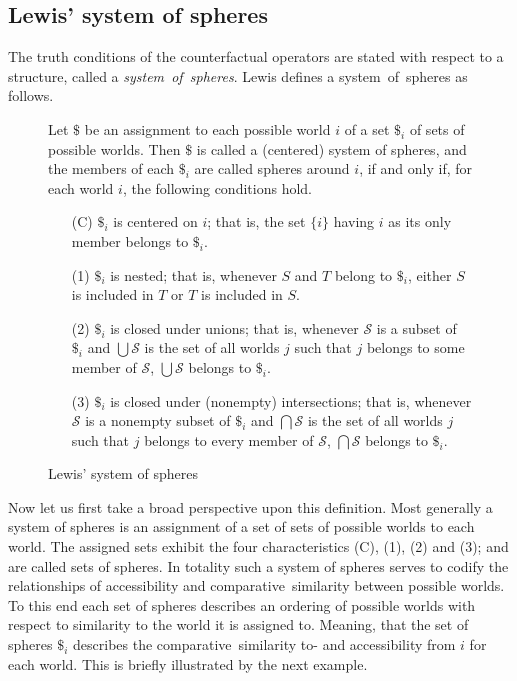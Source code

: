 \documentclass[a4paper,american]{paper}
\theoremstyle{definition}\newtheorem{definition}{Definition}
\begin{document}
\subsection{Lewis' system of spheres}
The truth conditions of the counterfactual operators are stated with respect to a structure, called a \textit{system~of~spheres}. Lewis defines a system~of~spheres as follows.
\begin{figure}[H]
	Let $\$$ be an assignment to each possible world $i$ of a set $\$_i$ of sets of possible worlds. Then $\$$ is called a (centered) system of spheres, and the members of each $\$_i$ are called spheres around $i$, if and only if, for each world $i$, the following conditions hold.
	\begin{itemize}
	\item[(C)] $\$_i$ is centered on $i$; that is, the set $\{i\}$ having $i$ as its only member belongs to $\$_i$.
	\item[(1)] $\$_i$ is nested; that is, whenever $S$ and $T$ belong to $\$_i$, either $S$ is included in $T$ or $T$ is included in $S$.
	\item[(2)] $\$_i$ is closed under unions; that is, whenever $\mathscr{S}$ is a subset of $\$_i$ and $\bigcup\mathscr{S}$ is the set of all worlds $j$ such that $j$ belongs to some member of $\mathscr{S}$, $\bigcup\mathscr{S}$ belongs to $\$_i$.
	\item[(3)] $\$_i$ is closed under (nonempty) intersections; that is, whenever $\mathscr{S}$ is a nonempty subset of $\$_i$ and $\bigcap\mathscr{S}$ is the set of all worlds $j$ such that $j$ belongs to every member of $\mathscr{S}$, $\bigcap\mathscr{S}$ belongs to $\$_i$.
	\end{itemize}
	\caption{Lewis' system of spheres}
	\label{fig:system_of_spheres}
\end{figure}
\noindent Now let us first take a broad perspective upon this definition. Most generally a system of spheres is an assignment of a set of sets of possible worlds to each world. The assigned sets exhibit the four characteristics (C), (1), (2) and (3); and are called sets of spheres. In totality such a system of spheres serves to codify the relationships of accessibility and comparative~similarity between possible worlds. To this end each set of spheres describes an ordering of possible worlds with respect to similarity to the world it is assigned to. Meaning, that the set of spheres $\$_i$ describes the comparative~similarity to- and accessibility from $i$ for each world. This is briefly illustrated by the next example.
\end{document}
